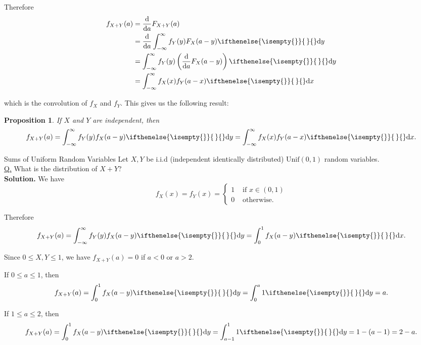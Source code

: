 \documentclass[a4paper,11pt]{amsbook}
\makeatletter
\def\section{\@startsection{section}{2}%
    \z@{1\linespacing\@plus1\linespacing}{.5\linespacing}%
    {\large\normalfont\bfseries\centering\color{darkblue}}}
\newtheorem{proposition}{\hspace{-2em} \color{darkblue} Proposition}[chapter]
\theoremstyle{definition}
\theoremstyle{remark}
\newcommand\0{\varnothing}
\newcommand\dx[1][]{\ifthenelse{\isempty{#1}}{\,}{}\mathrm{d}x}
\newcommand\dy[1][]{\ifthenelse{\isempty{#1}}{\,}{}\mathrm{d}y}
\newcommand\Unif{\text{Unif}}
\newcommand\diff[2][]
{
    \frac{\mathrm{d}#1}{\mathrm{d}#2}
}
\makeatother
\begin{document}
    Therefore \begin{align*}
        f_{X+Y}(a)&=\diff{a}F_{X+Y}(a) \\
        &=\diff{a}\int_{-\infty}^\infty f_Y(y)F_X(a-y)\dy \\
        &=\int_{-\infty}^\infty f_Y(y)\left(\diff{a}F_X(a-y)\right)\dy \\
        &=\int_{-\infty}^\infty f_X(x)f_Y(a-x)\dx
    \end{align*}

    which is the convolution of $f_X$ and $f_Y$. This gives us the following result:

    \begin{proposition}
        If $X$ and $Y$ are independent, then $$f_{X+Y}(a)=\int_{-\infty}^\infty f_Y(y)f_X(a-y)\dy=\int_{-\infty}^\infty f_X(x)f_Y(a-x)\dx.$$
    \end{proposition}

    \section{Sums of Uniform Random Variables}
    Let $X,Y$ be i.i.d (independent identically distributed) $\Unif(0,1)$ random variables.\\
    \underline{Q.} What is the distribution of $X+Y$?\\
    \textbf{Solution.} We have $$f_X(x)=f_Y(x)=\begin{cases}
        1 & \text{ if } x\in(0,1) \\
        0 & \text{ otherwise.}
    \end{cases}$$

    Therefore
    $$f_{X+Y}(a)=\int_{-\infty}^\infty f_Y(y)f_X(a-y)\dy=\int_0^1 f_X(a-y)\dx.$$

    Since $0\leq X,Y\leq1$, we have $f_{X+Y}(a)=0$ if $a<0$ or $a>2$.

    If $0\leq a\leq1$, then $$f_{X+Y}(a)=\int_0^1f_X(a-y)\dy=\int_0^a1\dy=a.$$

    If $1\leq a\leq2$, then $$f_{X+Y}(a)=\int_0^1f_X(a-y)\dy=\int_{a-1}^11\dy=1-(a-1)=2-a.$$
    \begin{center}
    \end{center}
\end{document}

